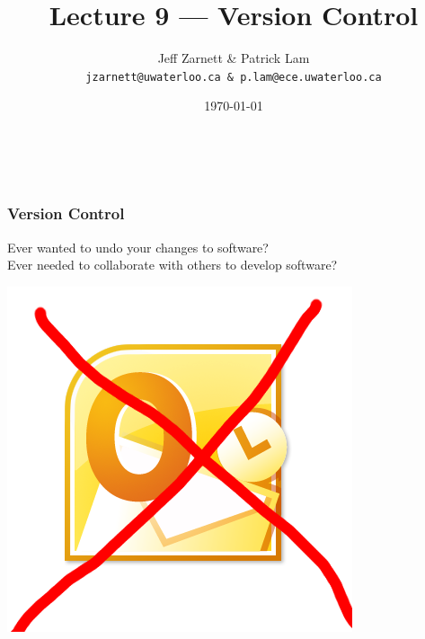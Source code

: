 

\title{Lecture 9 --- Version Control}

\author{Jeff Zarnett \& Patrick Lam \\ \small \texttt{jzarnett@uwaterloo.ca \& p.lam@ece.uwaterloo.ca}}
\date{\today}



\begin{frame}
  \titlepage

  \vfill
  \begin{center}
    \\
                  {\tiny\CcNote{\CcLongnameByNcSa}}
                  \vspace*{-2.5ex}
  \end{center}

\end{frame}

\begin{frame}
\frametitle{Version Control}

\begin{changemargin}{1cm}
\Large
Ever wanted to undo your changes to software? \\[1em]
Ever needed to collaborate with others to develop software?
\begin{center}
\includegraphics[width=.4\textwidth]{images/no-outlook}
\end{center}
\end{changemargin}

\end{frame}


